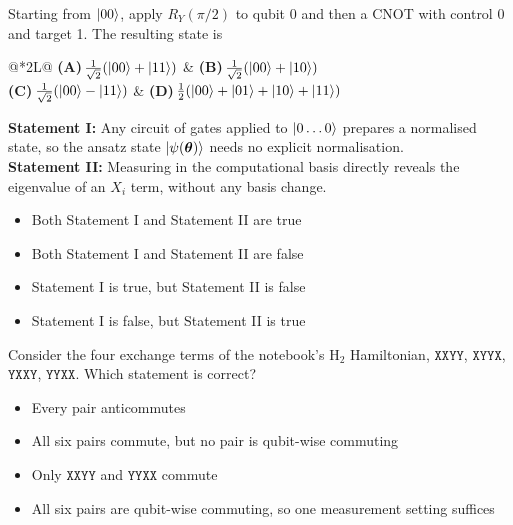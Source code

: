 \documentclass[11pt,a4paper]{article}
\newcommand{\optlabel}[1]{\textbf{(#1)}}
\newenvironment{qitem}[1]{\begin{list}{}{\setlength{\leftmargin}{3.3em}\setlength{\labelwidth}{3.1em}%
  \setlength{\labelsep}{0.2em}\setlength{\topsep}{3pt}\setlength{\parsep}{3pt}}\item[\textbf{Q.#1}\hfill]}{\end{list}}
\newcommand{\qsep}{\par\vspace{2pt}{\color{black!15}\hrule}\vspace{4pt}}
\begin{document}
\begin{qitem}{27}
Starting from $\ket{00}$, apply $R_Y(\pi/2)$ to qubit 0 and then a CNOT with control 0 and target 1. The resulting state is
\par\smallskip\noindent\begin{tabularx}{\linewidth}{@{}*{2}{L}@{}}
\optlabel{A}\,$\tfrac{1}{\sqrt2}(\ket{00} + \ket{11})$ & \optlabel{B}\,$\tfrac{1}{\sqrt2}(\ket{00} + \ket{10})$ \\[3pt]
\optlabel{C}\,$\tfrac{1}{\sqrt2}(\ket{00} - \ket{11})$ & \optlabel{D}\,$\tfrac12(\ket{00} + \ket{01} + \ket{10} + \ket{11})$
\end{tabularx}
\end{qitem}
\qsep

\begin{qitem}{28}
\textbf{Statement I:} Any circuit of gates applied to $\ket{0\dots0}$ prepares a normalised state, so the ansatz state $\ket{\psi(\boldsymbol\theta)}$ needs no
explicit normalisation.\\[1mm]
\textbf{Statement II:} Measuring in the computational basis directly reveals the eigenvalue of an $X_i$ term, without any basis change.
\begin{itemize}[leftmargin=2.6em, labelsep=0.4em, itemsep=2pt, topsep=3pt]
\item[\optlabel{A}] Both Statement I and Statement II are true
\item[\optlabel{B}] Both Statement I and Statement II are false
\item[\optlabel{C}] Statement I is true, but Statement II is false
\item[\optlabel{D}] Statement I is false, but Statement II is true
\end{itemize}
\end{qitem}
\qsep

\begin{qitem}{29}
Consider the four exchange terms of the notebook's H$_2$ Hamiltonian, $\texttt{XXYY}$, $\texttt{XYYX}$, $\texttt{YXXY}$, $\texttt{YYXX}$. Which statement is
correct?
\begin{itemize}[leftmargin=2.6em, labelsep=0.4em, itemsep=2pt, topsep=3pt]
\item[\optlabel{A}] Every pair anticommutes
\item[\optlabel{B}] All six pairs commute, but no pair is qubit-wise commuting
\item[\optlabel{C}] Only $\texttt{XXYY}$ and $\texttt{YYXX}$ commute
\item[\optlabel{D}] All six pairs are qubit-wise commuting, so one measurement setting suffices
\end{itemize}
\end{qitem}
\qsep
\end{document}
